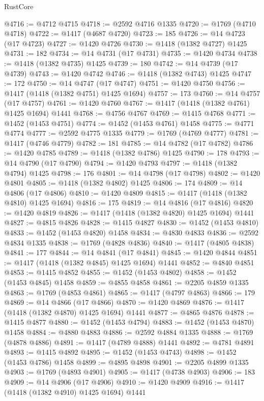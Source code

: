 \begin{lexlean}{RustCore}
\begin{coremodule}
@4716 := @4712 @4715
@4718 := @2592 @4716 @1335
@4720 := @1769 (@4710 @4718)
@4722 := @1417 (@4687 @4720)
@4723 := 185
@4726 := @14 @4723 (@17 @4723)
@4727 := @1420 @4726
@4730 := @1418 (@1382 @4727) @1425
@4731 := 182
@4734 := @14 @4731 (@17 @4731)
@4735 := @1420 @4734
@4738 := @1418 (@1382 @4735) @1425
@4739 := 180
@4742 := @14 @4739 (@17 @4739)
@4743 := @1420 @4742
@4746 := @1418 (@1382 @4743) @1425
@4747 := 172
@4750 := @14 @4747 (@17 @4747)
@4751 := @1420 @4750
@4756 := @1417 (@1418 (@1382 @4751) @1425 @1694)
@4757 := 173
@4760 := @14 @4757 (@17 @4757)
@4761 := @1420 @4760
@4767 := @1417 (@1418 (@1382 @4761) @1425 @1694) @1441
@4768 := @4756 @4767
@4769 := @1415 @4768
@4771 := @1452 (@1453 @4751)
@4774 := @1452 (@1453 @4761) @1458
@4775 := @4771 @4774
@4777 := @2592 @4775 @1335
@4779 := @1769 (@4769 @4777)
@4781 := @1417 (@4746 @4779)
@4782 := 181
@4785 := @14 @4782 (@17 @4782)
@4786 := @1420 @4785
@4789 := @1418 (@1382 @4786) @1425
@4790 := 178
@4793 := @14 @4790 (@17 @4790)
@4794 := @1420 @4793
@4797 := @1418 (@1382 @4794) @1425
@4798 := 176
@4801 := @14 @4798 (@17 @4798)
@4802 := @1420 @4801
@4805 := @1418 (@1382 @4802) @1425
@4806 := 174
@4809 := @14 @4806 (@17 @4806)
@4810 := @1420 @4809
@4815 := @1417 (@1418 (@1382 @4810) @1425 @1694)
@4816 := 175
@4819 := @14 @4816 (@17 @4816)
@4820 := @1420 @4819
@4826 := @1417 (@1418 (@1382 @4820) @1425 @1694) @1441
@4827 := @4815 @4826
@4828 := @1415 @4827
@4830 := @1452 (@1453 @4810)
@4833 := @1452 (@1453 @4820) @1458
@4834 := @4830 @4833
@4836 := @2592 @4834 @1335
@4838 := @1769 (@4828 @4836)
@4840 := @1417 (@4805 @4838)
@4841 := 177
@4844 := @14 @4841 (@17 @4841)
@4845 := @1420 @4844
@4851 := @1417 (@1418 (@1382 @4845) @1425 @1694) @1441
@4852 := @4840 @4851
@4853 := @1415 @4852
@4855 := @1452 (@1453 @4802)
@4858 := @1452 (@1453 @4845) @1458
@4859 := @4855 @4858
@4861 := @2205 @4859 @1335
@4863 := @1769 (@4853 @4861)
@4865 := @1417 (@4797 @4863)
@4866 := 179
@4869 := @14 @4866 (@17 @4866)
@4870 := @1420 @4869
@4876 := @1417 (@1418 (@1382 @4870) @1425 @1694) @1441
@4877 := @4865 @4876
@4878 := @1415 @4877
@4880 := @1452 (@1453 @4794)
@4883 := @1452 (@1453 @4870) @1458
@4884 := @4880 @4883
@4886 := @2592 @4884 @1335
@4888 := @1769 (@4878 @4886)
@4891 := @1417 (@4789 @4888) @1441
@4892 := @4781 @4891
@4893 := @1415 @4892
@4895 := @1452 (@1453 @4743)
@4898 := @1452 (@1453 @4786) @1458
@4899 := @4895 @4898
@4901 := @2205 @4899 @1335
@4903 := @1769 (@4893 @4901)
@4905 := @1417 (@4738 @4903)
@4906 := 183
@4909 := @14 @4906 (@17 @4906)
@4910 := @1420 @4909
@4916 := @1417 (@1418 (@1382 @4910) @1425 @1694) @1441

\end{coremodule}
\end{lexlean}
